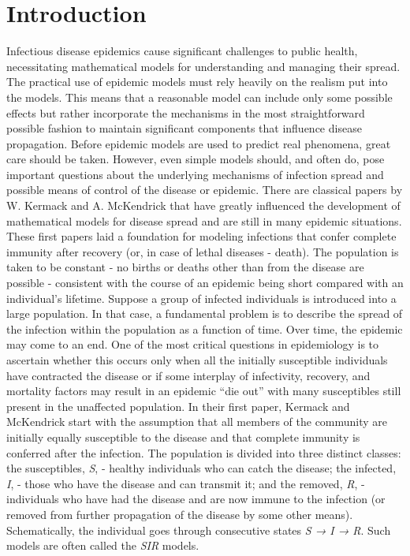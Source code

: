 \section{Introduction}\label{Introduction}\thispagestyle{SectionFirstPage} %
\hspace{\parindent} Infectious disease epidemics cause significant challenges to public health, necessitating mathematical models for understanding and managing their spread.
The practical use of epidemic models must rely heavily on the realism put into the models.
This means that a reasonable model can include only some possible effects but rather incorporate the mechanisms in the most straightforward possible fashion to maintain significant components that influence disease propagation.
Before epidemic models are used to predict real phenomena, great care should be taken.
However, even simple models should, and often do, pose important questions about the underlying mechanisms of infection spread and possible means of control of the disease or epidemic.
There are classical papers by W. Kermack and A. McKendrick \cite{Kermack} that have greatly influenced the development of mathematical models for disease spread and are still in many epidemic situations.
These first papers laid a foundation for modeling infections that confer complete immunity after recovery (or, in case of lethal diseases - death).
The population is taken to be constant - no births or deaths other than from the disease are possible - consistent with the course of an epidemic being short compared with an individual's lifetime.
Suppose a group of infected individuals is introduced into a large population. In that case, a fundamental problem is to describe the spread of the infection within the population as a function of time.
Over time, the epidemic may come to an end.
One of the most critical questions in epidemiology is to ascertain whether this occurs only when all the initially susceptible individuals have contracted the disease or if some interplay of infectivity, recovery, and mortality factors may result in an epidemic “die out” with many susceptibles still present in the unaffected population.
In their first paper, Kermack and McKendrick start with the assumption that all members of the community are initially equally susceptible to the disease and that complete immunity is conferred after the infection.
The population is divided into three distinct classes: the susceptibles, \textit{S}, - healthy individuals who can catch the disease; the infected, \textit{I}, - those who have the disease and can transmit it; and the removed, \textit{R}, - individuals who have had the disease and are now immune to the infection (or removed from further propagation of the disease by some other means).
Schematically, the individual goes through consecutive states \textit{S → I → R}.
Such models are often called the \textit{SIR} models.
